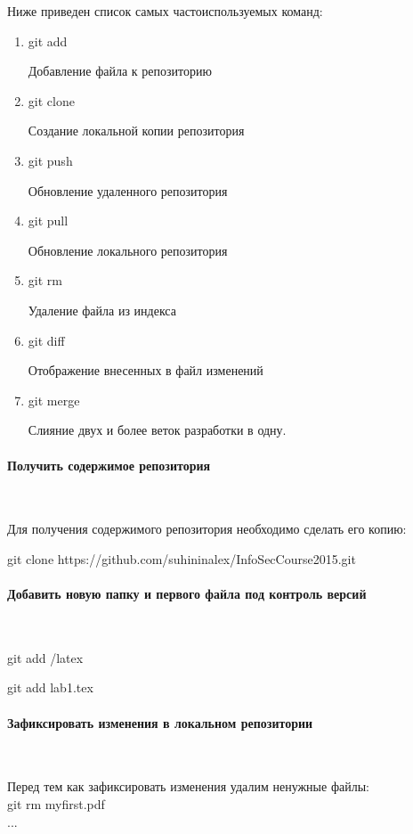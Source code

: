 \documentclass{article}
\begin{document}
Ниже приведен список самых частоиспользуемых команд:
\begin{enumerate}
\item git add

Добавление файла к репозиторию

\item git clone

Создание локальной копии репозитория

\item git push

Обновление удаленного репозитория

\item git pull

Обновление локального репозитория

\item git rm

Удаление файла из индекса

\item git diff

Отображение внесенных в файл изменений

\item git merge 

Слияние двух и более веток разработки в одну.
\end{enumerate}

\paragraph{Получить содержимое репозитория}
~

Для получения содержимого репозитория необходимо сделать его копию:

git clone https://github.com/suhininalex/InfoSecCourse2015.git

\paragraph{Добавить новую папку и первого файла под контроль версий}
~

git add /latex

git add lab1.tex

\paragraph{Зафиксировать изменения в локальном репозитории}
~

Перед тем как зафиксировать изменения удалим ненужные файлы: \\
git rm myfirst.pdf \\
...	\\
~
\end{document}
